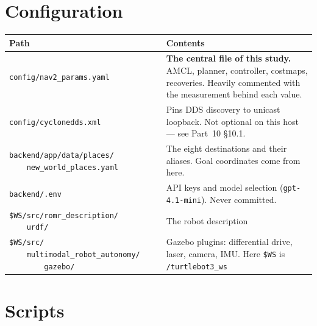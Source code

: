 \documentclass[11pt,a4paper]{report}
\newcommand{\file}[1]{\texttt{\small #1}}
\begin{document}
\section{Configuration}

\begin{center}
\small
\begin{tabular}{@{}p{}p{}@{}}
\toprule
\textbf{Path} & \textbf{Contents} \\
\midrule
\file{config/nav2\_params.yaml} &
  \textbf{The central file of this study.} AMCL, planner, controller,
  costmaps, recoveries. Heavily commented with the measurement behind each
  value. \\
\file{config/cyclonedds.xml} &
  Pins DDS discovery to unicast loopback. Not optional on this host --- see
  Part~10 \S10.1. \\
\file{backend/app/data/places/} \newline \file{\ \ \ \ new\_world\_places.yaml} &
  The eight destinations and their aliases. Goal coordinates come from here. \\
\file{backend/.env} &
  API keys and model selection (\file{gpt-4.1-mini}). Never committed. \\
\midrule
\file{\$WS/src/romr\_description/} \newline \file{\ \ \ \ urdf/} & The robot description \\
\file{\$WS/src/} \newline \file{\ \ \ \ multimodal\_robot\_autonomy/} \newline \file{\ \ \ \ \ \ \ \ gazebo/} &
  Gazebo plugins: differential drive, laser, camera, IMU. Here
  \file{\$WS} is \file{\raisebox{0pt}{\textasciitilde}/turtlebot3\_ws} \\
\bottomrule
\end{tabular}
\end{center}

\section{Scripts}
\end{document}
